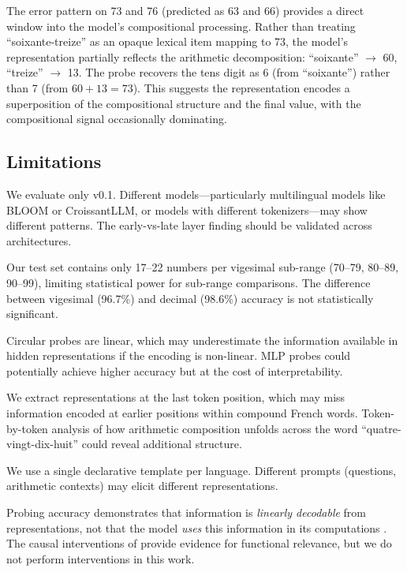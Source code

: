 The error pattern on 73 and 76 (predicted as 63 and 66) provides a direct window into the model's compositional processing. Rather than treating ``soixante-treize'' as an opaque lexical item mapping to 73, the model's representation partially reflects the arithmetic decomposition: ``soixante'' $\to$ 60, ``treize'' $\to$ 13. The probe recovers the tens digit as 6 (from ``soixante'') rather than 7 (from $60+13=73$). This suggests the representation encodes a superposition of the compositional structure and the final value, with the compositional signal occasionally dominating.

\subsection{Limitations}

 We evaluate only \mistral v0.1. Different models---particularly multilingual models like BLOOM or CroissantLLM, or models with different tokenizers---may show different patterns. The early-vs-late layer finding should be validated across architectures.

 Our test set contains only 17--22 numbers per vigesimal sub-range (70--79, 80--89, 90--99), limiting statistical power for sub-range comparisons. The difference between vigesimal (96.7\%) and decimal (98.6\%) accuracy is not statistically significant.

 Circular probes are linear, which may underestimate the information available in hidden representations if the encoding is non-linear. MLP probes could potentially achieve higher accuracy but at the cost of interpretability.

 We extract representations at the last token position, which may miss information encoded at earlier positions within compound French words. Token-by-token analysis of how arithmetic composition unfolds across the word ``quatre-vingt-dix-huit'' could reveal additional structure.

 We use a single declarative template per language. Different prompts (\eg questions, arithmetic contexts) may elicit different representations.

 Probing accuracy demonstrates that information is \emph{linearly decodable} from representations, not that the model \emph{uses} this information in its computations \citep{belinkov2022probing}. The causal interventions of \citet{levy2024language} provide evidence for functional relevance, but we do not perform interventions in this work.
